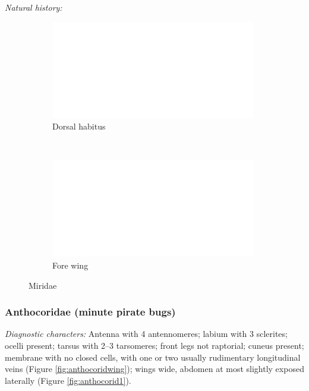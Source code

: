 \documentclass[letterpaper, 11pt]{article}
\begin{document}
\noindent{}\textit{Natural history:} \\

\begin{figure}[ht!]
 \centering
 \begin{subfigure}[ht!]{0.45\textwidth}
  \includegraphics[width=\textwidth]{image14}
  \caption{Dorsal habitus}
  \label{fig:mirid1}
 \end{subfigure}
 ~ %
 \begin{subfigure}[ht!]{0.45\textwidth}
  \includegraphics[width=\textwidth]{image14}
  \caption{Fore wing}
  \label{fig:miridwing}
 \end{subfigure}
 \caption{Miridae}\label{fig:miridae}
\end{figure}

\subsubsection{Anthocoridae (minute pirate bugs)}
\noindent{}\textit{Diagnostic characters:} Antenna with 4 antennomeres; labium with 3 sclerites; ocelli present; tarsus with 2--3 tarsomeres; front legs not raptorial; cuneus present; membrane with no closed cells, with one or two usually rudimentary longitudinal veins (Figure \ref{fig:anthocoridwing}); wings wide, abdomen at most slightly exposed laterally (Figure \ref{fig:anthocorid1}).\\
\end{document}
